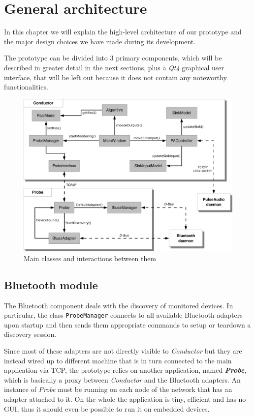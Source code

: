 \documentclass{IEEEtran}
\newcommand{\Conductor}{\textsl{Conductor}}
\newcommand{\Probe}{\textsl{Probe}}
\begin{document}
\section{General architecture}
In this chapter we will explain the high-level architecture of our prototype and the major design choices we have made during its development.

The prototype can be divided into 3 primary components, which will be described in greater detail in the next sections, plus a \textsl{Qt4} graphical user interface, that will be left out because it does not contain any noteworthy functionalities.

\begin{figure}
\centering
\includegraphics[width=.85\textwidth]{Arch}
\caption{Main classes and interactions between them}
\label{arch}
\end{figure}

\subsection{Bluetooth module}
\label{btmod}
The Bluetooth component deals with the discovery of monitored devices. In particular, the class \texttt{ProbeManager} connects to all available Bluetooth adapters upon startup and then sends them appropriate commands to setup or teardown a discovery session.

Since most of these adapters are not directly visible to \Conductor{} but they are instead wired up to different machine that is in turn connected to the main application via TCP, the prototype relies on another application, named \textbf{\Probe{}}, which is basically a proxy between \Conductor{} and the Bluetooth adapters. An instance of \Probe{} must be running on each node of the network that has an adapter attached to it. On the whole the application is tiny, efficient and has no GUI, thus it should even be possible to run it on embedded devices.
\end{document}
